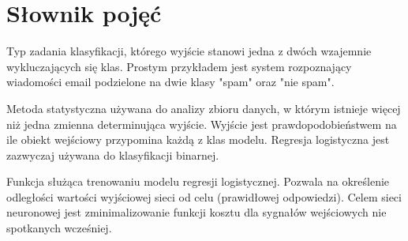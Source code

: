 \documentclass[12pt,a4paper,twoside,titlepage,openright]{book}
\begin{document}
\chapter*{Słownik pojęć}
\begin{description}[style=nextline]
	\item[Klasyfikacja binarna] Typ zadania klasyfikacji, którego wyjście stanowi jedna z dwóch wzajemnie wykluczających się klas. Prostym przykładem jest system rozpoznający wiadomości email podzielone na dwie klasy "spam" oraz "nie spam".
	\item[Regresja logistyczna] Metoda statystyczna używana do analizy zbioru danych, w którym istnieje więcej niż jedna zmienna determinująca wyjście. Wyjście jest prawdopodobieństwem na ile obiekt wejściowy przypomina każdą z klas modelu. Regresja logistyczna jest zazwyczaj używana do klasyfikacji binarnej. %
	\item[Funkcja kosztu] Funkcja służąca trenowaniu modelu regresji logistycznej. Pozwala na określenie odległości wartości wyjściowej sieci od celu (prawidłowej odpowiedzi). Celem sieci neuronowej jest zminimalizowanie funkcji kosztu dla sygnałów wejściowych nie spotkanych wcześniej.%

\end{description}
\end{document}
